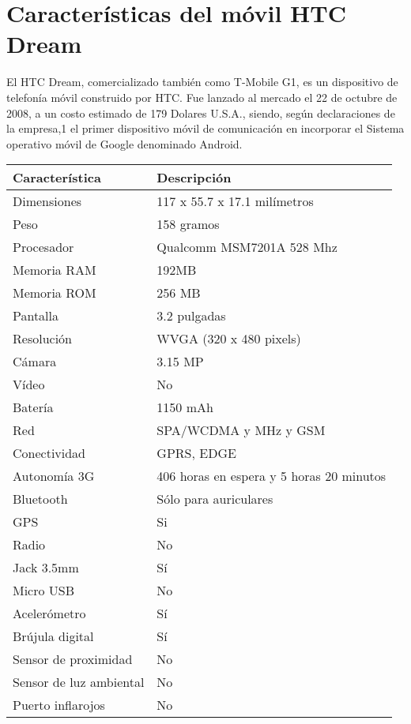 \section*{Características del móvil HTC Dream}

El HTC Dream, comercializado también como T-Mobile G1, es un dispositivo de telefonía móvil construido por HTC. Fue lanzado al mercado el 22 de octubre de 2008, a un costo estimado de 179 Dolares U.S.A., siendo, según declaraciones de la empresa,1 el primer dispositivo móvil de comunicación en incorporar el Sistema operativo móvil de Google denominado Android.
\newline
\begin{center}
\begin{tabular}{|l|l|}
\hline
\rowcolor[gray]{.8}Característica & Descripción \\\hline
\hline
Dimensiones  			&117 x 55.7 x 17.1 milímetros						\\\hline
Peso				 	& 158 gramos 								 	\\\hline
Procesador			& Qualcomm MSM7201A 528 Mhz				 	\\\hline
Memoria RAM	 		& 192MB 										\\\hline
Memoria ROM  			& 256 MB										\\\hline
Pantalla		 		& 3.2 pulgadas									\\\hline
Resolución	 			& WVGA (320 x 480 pixels)							\\\hline
Cámara			 	& 3.15 MP										\\\hline
Vídeo				& No											\\\hline
Batería			 	& 1150  mAh 									\\\hline
Red					& SPA/WCDMA y MHz y GSM						\\\hline
Conectividad			& GPRS, EDGE 									\\\hline
Autonomía	3G 			& 406 horas en espera y 5 horas 20 minutos  			\\\hline
Bluetooth				& Sólo para auriculares							\\\hline
GPS 					& Si											\\\hline
Radio				& No											\\\hline
Jack 3.5mm			& Sí											\\\hline
Micro USB				& No											\\\hline
Acelerómetro			& Sí											\\\hline
Brújula digital 			& Sí											\\\hline
Sensor de proximidad 	& No											\\\hline
Sensor de luz ambiental 	& No											\\\hline
Puerto inflarojos			& No											\\\hline
\end{tabular}
\end{center}



